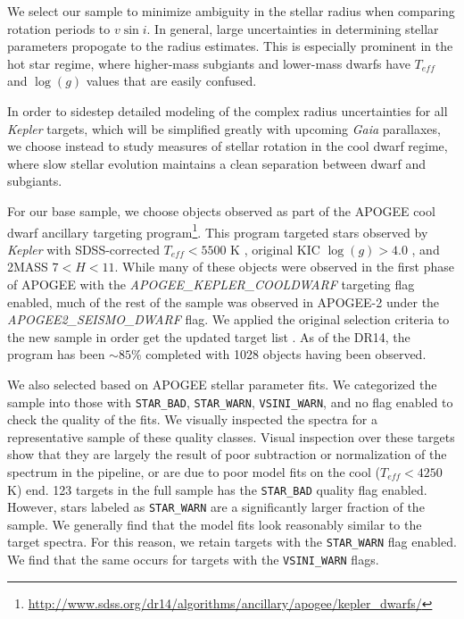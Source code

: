 \documentclass[manuscript]{aastex6}
\newcommand{\vsini}{\ensuremath{v \sin i}}
\newcommand{\Kepler}{\mbox{\textit{Kepler}}}
\newcommand{\Gaia}{\mbox{\textit{Gaia}}}
\newcommand{\Teff}{\ensuremath{T_{eff}}}
\newcommand{\logg}{\ensuremath{\log(g)}}
\newcommand{\STARBAD}{\texttt{STAR\_BAD}}
\newcommand{\STARWARN}{\texttt{STAR\_WARN}}
\newcommand{\VSINIWARN}{\texttt{VSINI\_WARN}}
\newcommand{\gvs}{\authorcomment1}
\begin{document}
We select our sample to minimize ambiguity in the stellar radius when
comparing rotation periods to \vsini. In general, large uncertainties in
determining stellar parameters propogate to the radius estimates. This is 
especially prominent in the hot star regime, where higher-mass subgiants and 
lower-mass dwarfs have \Teff{} and \logg{} values that are easily confused.

In order to sidestep detailed modeling of the complex radius uncertainties 
for all \Kepler{} targets, which will be simplified greatly with upcoming
\Gaia{} parallaxes, we choose instead to study measures of
stellar rotation in the cool  dwarf regime, where
slow stellar evolution maintains a clean separation between dwarf and
subgiants. 

For our base sample, we choose objects observed as part of the APOGEE cool
dwarf ancillary targeting
program\footnote{\url{http://www.sdss.org/dr14/algorithms/ancillary/apogee/kepler_dwarfs/}}.
This program targeted stars observed by \Kepler{} with SDSS-corrected
\(\Teff < 5500\) K \citep{Pinsonneault12}, original KIC \(\logg > 4.0\)
\citep{Brown11}, and 2MASS \(7 < H < 11\). While many of these objects
were observed in the first phase of APOGEE with the
\textit{APOGEE\_KEPLER\_COOLDWARF} targeting flag enabled, much of the rest of
the sample was observed in APOGEE-2 under the \textit{APOGEE2\_SEISMO\_DWARF}
flag. We applied the original selection criteria to the new sample in order get
the updated target list \gvs{Use Jen's original list for this?}. As of the DR14, 
the program has been \(\sim 85\)\% completed with 1028 objects having been 
observed. 

We also selected based on APOGEE stellar parameter fits. We categorized the 
sample into those with \STARBAD, \STARWARN,
\VSINIWARN{}, and no flag enabled to check the quality of the fits. We
visually inspected the spectra for a representative sample of these
quality classes. 
Visual inspection over these targets show that they are largely
the result of poor subtraction or normalization of the spectrum in the
pipeline, or are due to poor model fits on the cool (\(\Teff < 4250\) K) end. 123
targets in the full sample has the \STARBAD{} quality flag enabled. 
However, stars labeled as \STARWARN{} are a significantly larger fraction of the 
sample. We generally find that the model fits look reasonably similar to the 
target spectra. For this reason, we retain targets
with the \STARWARN{} flag enabled. We find that the same occurs for targets with 
the \VSINIWARN{} flags.
\end{document}

